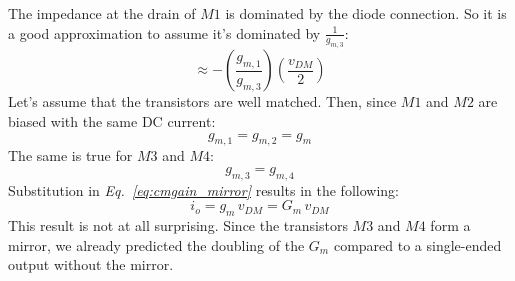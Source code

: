 The impedance at the drain of $M1$ is dominated by the diode connection.  So it is a good approximation to assume it's dominated by $\frac{1}{g_{m,3}}$:
    \begin{equation}
        \approx - \left(\frac{g_{m,1}}{g_{m,3}}\right) \left(\frac{v_{DM}}{2}\right)
    \end{equation}
Let's assume that the transistors are well matched.  Then, since $M1$ and $M2$ are biased with the same DC current:
    \begin{equation}
        g_{m,1} = g_{m,2} = g_m
    \end{equation}
The same is true for $M3$ and $M4$:
    \begin{equation}
        g_{m,3} = g_{m,4}
    \end{equation}
Substitution in \emph{Eq.~\ref{eq:cmgain_mirror}} results in the following:
    \begin{equation}
        i_o = g_m\,v_{DM} = G_m\,v_{DM}
    \end{equation}
This result is not at all surprising.  Since the transistors $M3$ and $M4$ form a mirror, we already predicted the doubling of the $G_m$ compared to a single-ended output without the mirror.


